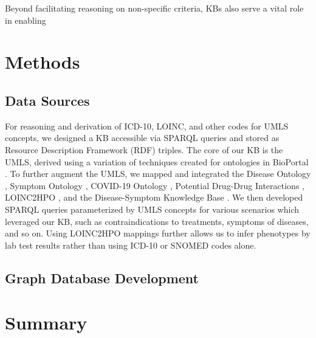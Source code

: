 \documentclass[../main.tex]{subfiles}
\begin{document}
Beyond facilitating reasoning on non-specific criteria, KBs also serve a vital role in enabling 

\section{Methods}

\subsection{Data Sources}





For reasoning and derivation of ICD-10, LOINC, and other codes for UMLS concepts, we designed a KB accessible via SPARQL queries and stored as Resource Description Framework (RDF) \cite{manola2004rdf} triples. The core of our KB is the UMLS, derived using a variation of techniques created for ontologies in BioPortal \cite{noy2009bioportal}. To further augment the UMLS, we mapped and integrated the Disease Ontology \cite{schriml2012disease}, Symptom Ontology \cite{sayers2010database}, COVID-19 Ontology \cite{sargsyan2020covid}, Potential Drug-Drug Interactions \cite{ayvaz2015toward}, LOINC2HPO \cite{zhang2019semantic}, and the Disease-Symptom Knowledge Base \cite{wang2008automated}. We then developed SPARQL queries parameterized by UMLS concepts for various scenarios which leveraged our KB, such as contraindications to treatments, symptoms of diseases, and so on. Using LOINC2HPO mappings further allows us to infer phenotypes by lab test results rather than using ICD-10 or SNOMED codes alone. 

\subsection{Graph Database Development}

\section{Summary}
\end{document}
